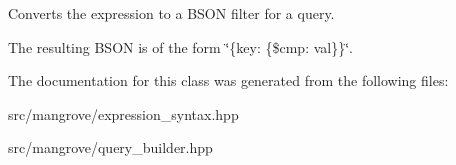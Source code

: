 Converts the expression to a B\+S\+ON filter for a query. 

The resulting B\+S\+ON is of the form \char`\"{}\{key\+: \{\$cmp\+: val\}\}\char`\"{}. 

The documentation for this class was generated from the following files\+:\begin{DoxyCompactItemize}
\item 
src/mangrove/expression\+\_\+syntax.\+hpp\item 
src/mangrove/query\+\_\+builder.\+hpp\end{DoxyCompactItemize}
